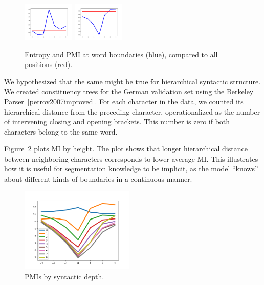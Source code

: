 \begin{figure}
\includegraphics[width=0.22\textwidth]{figures/segmentation-profile-flattened-entropies-german.png}
\includegraphics[width=0.22\textwidth]{figures/segmentation-profile-flattened-pmis-german.png}
	\caption{Entropy and PMI at word boundaries (blue), compared to all positions (red). }\label{fig:syntax-depth}
\end{figure}





We hypothesized that the same might be true for hierarchical syntactic structure.
We created constituency trees for the German validation set using the Berkeley Parser~\ref{petrov2007improved}.
For each character in the data, we counted its hierarchical distance from the preceding character, operationalized as the number of intervening closing and opening brackets.
This number is zero if both characters belong to the same word.

Figure~\ref{fig:syntax-depth} plots MI by height.
The plot shows that longer hierarchical distance between neighboring characters corresponds to lower average MI.
This illustrates how it is useful for
segmentation knowledge to be implicit, as the model ``knows'' about
different kinds of boundaries in a continuous manner.



\begin{figure}
\includegraphics[width=0.48\textwidth]{figures/segmentation-profile-pmis-german-all-heights.png}
\caption{PMIs by syntactic depth.}\label{fig:syntax-depth}
\end{figure}




